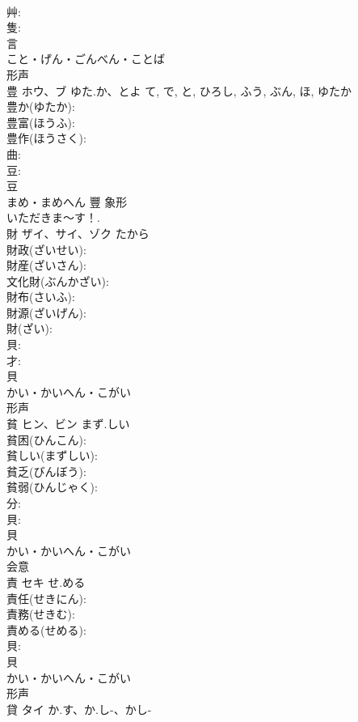 \documentclass[8pt]{extreport}
\begin{document}
\begin{CJK}{UTF8}{min}
\\	艸: 
\\	隻: 
\\	言	
\\	こと・げん・ごんべん・ことば	
\\	形声 
\\	豊	ホウ、ブ	ゆた.か、とよ	て, で, と, ひろし, ふう, ぶん, ほ, ゆたか	
\\	豊か(ゆたか): 
\\	豊富(ほうふ): 
\\	豊作(ほうさく): 
\\	曲: 
\\	豆: 
\\	豆	
\\	まめ・まめへん	豐	象形 
\\	いただきま〜す！.	
\\	財	ザイ、サイ、ゾク	たから		
\\	財政(ざいせい): 
\\	財産(ざいさん): 
\\	文化財(ぶんかざい): 
\\	財布(さいふ): 
\\	財源(ざいげん): 
\\	財(ざい): 
\\	貝: 
\\	才: 
\\	貝	
\\	かい・かいへん・こがい	
\\	形声 
\\	貧	ヒン、ビン	まず.しい		
\\	貧困(ひんこん): 
\\	貧しい(まずしい): 
\\	貧乏(びんぼう): 
\\	貧弱(ひんじゃく): 
\\	分: 
\\	貝: 
\\	貝	
\\	かい・かいへん・こがい	
\\	会意 
\\	責	セキ	せ.める		
\\	責任(せきにん): 
\\	責務(せきむ): 
\\	責める(せめる): 
\\	貝: 
\\	貝	
\\	かい・かいへん・こがい	
\\	形声 
\\	貸	タイ	か.す、か.し-、かし-		

\end{CJK}
\end{document}

